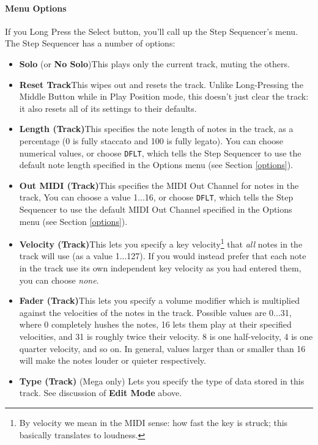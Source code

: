 \documentclass{article}
\begin{document}
\paragraph{Menu Options}

If you Long Press the Select button, you'll call up the Step Sequencer's menu.  The Step Sequencer has a number of options:

\begin{itemize}
\item {\bf Solo} (or {\bf No Solo})\quad This plays only the current track, muting the others.
\item {\bf Reset Track}\quad This wipes out and resets the track.  Unlike Long-Pressing the Middle Button while in Play Position mode, this doesn't just clear the track: it also resets all of its settings to their defaults.
\item {\bf Length (Track)}\quad This specifies the note length of notes in the track, as a percentage (0 is fully staccato and 100 is fully legato).   You can choose numerical values, or choose \texttt{DFLT}, which tells the Step Sequencer to use the default note length specified in the Options menu (see Section \ref{options}).
\item {\bf Out MIDI (Track)}\quad This specifies the MIDI Out Channel for notes in the track,    You can choose a value 1...16, or choose \texttt{DFLT}, which tells the Step Sequencer to use the default MIDI Out Channel specified in the Options menu (see Section \ref{options}).
\item {\bf Velocity (Track)}\quad This lets you specify a key velocity\footnote{By velocity we mean in the MIDI sense: how fast the key is struck; this basically translates to loudness.} that {\it all} notes in the track will use (as a value 1...127).  If you would instead prefer that each note in the track use its own independent key velocity as you had entered them, you can choose {\it none}.
\item {\bf Fader (Track)}\quad This lets you specify a volume modifier which is multiplied against the velocities of the notes in the track.  Possible values are 0...31, where 0 completely hushes the notes, 16 lets them play at their specified velocities, and 31 is roughly twice their velocity.  8 is one half-velocity, 4 is one quarter velocity, and so on.  In general, values larger than or smaller than 16 will make the notes louder or quieter respectively.
\item {\bf Type (Track)} (Mega only) \quad Lets you specify the type of data stored in this track.  See discussion of {\bf Edit Mode} above.

\end{itemize}
\end{document}
